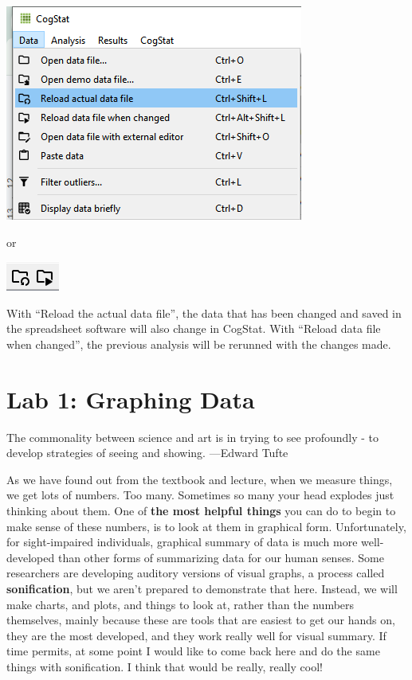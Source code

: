 \documentclass[
]{book}
\begin{document}
\includegraphics{img/intro/reloadfile_menu.png}

or

\includegraphics{img/intro/reload_icon.png}

With ``Reload the actual data file'', the data that has been changed and saved in the spreadsheet software will also change in CogStat. With ``Reload data file when changed'', the previous analysis will be rerunned with the changes made.

\hypertarget{lab-1-graphing-data}{%
\chapter{Lab 1: Graphing Data}\label{lab-1-graphing-data}}

{
The commonality between science and art is in trying to see profoundly - to develop strategies of seeing and showing.
---Edward Tufte
}

As we have found out from the textbook and lecture, when we measure things, we get lots of numbers. Too many. Sometimes so many your head explodes just thinking about them. One of \textbf{the most helpful things} you can do to begin to make sense of these numbers, is to look at them in graphical form. Unfortunately, for sight-impaired individuals, graphical summary of data is much more well-developed than other forms of summarizing data for our human senses. Some researchers are developing auditory versions of visual graphs, a process called \textbf{sonification}, but we aren't prepared to demonstrate that here. Instead, we will make charts, and plots, and things to look at, rather than the numbers themselves, mainly because these are tools that are easiest to get our hands on, they are the most developed, and they work really well for visual summary. If time permits, at some point I would like to come back here and do the same things with sonification. I think that would be really, really cool!
\end{document}
